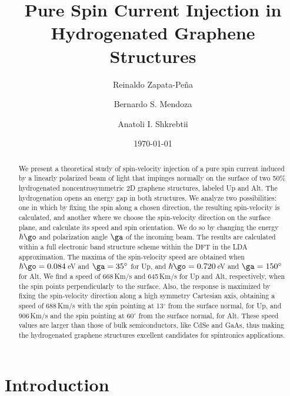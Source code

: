 \documentclass[floatfix,prb,aps,superscriptaddress,showpacs,11pt,preprint,letterpaper]{revtex4}
\begin{document}
\title{Pure Spin Current Injection in Hydrogenated Graphene Structures}
\author{Reinaldo Zapata-Pe\~na}
\author{Bernardo S. Mendoza}
\author{Anatoli I. Shkrebtii}

\date{\today}

\begin{abstract}
We present a theoretical study of spin-velocity injection of a pure spin current
induced by  a linearly polarized beam of light that impinges normally on the
surface of  two 50\% hydrogenated noncentrosymmetric 2D graphene structures,
labeled Up and Alt. The hydrogenation opens an energy gap in both structures. We
analyze two possibilities: one in which by fixing the spin along a chosen
direction, the resulting spin-velocity is calculated, and another where we
choose the spin-velocity direction on the surface plane, and calculate its speed
and spin orientation. We do so by changing the energy $\hbar\go$ and
polarization angle $\ga$  of the incoming  beam. The results are calculated
within a full electronic band structure scheme within the DFT in the LDA
approximation. The maxima of the spin-velocity speed are obtained when
$\hbar\go=0.084$\,eV and $\ga=35^\circ$ for Up, and $\hbar\go=0.720$\,eV and
$\ga=150^\circ$ for Alt. We find a speed of 668\,Km/s and 645\,Km/s for Up and
Alt, respectively, when the spin points perpendicularly to the surface. Also,
the response is maximized by fixing the spin-velocity direction along a high
symmetry Cartesian axis, obtaining a speed of 688\,Km/s with the spin  pointing
at 13$^\circ$ from the surface normal, for Up, and 906\,Km/s and the spin
pointing at 60$^\circ$ from the surface normal, for Alt. These speed values are
larger than those of bulk semiconductors, like CdSe and GaAs, thus making the
hydrogenated graphene structures excellent candidates for spintronics
applications.
\end{abstract}

\maketitle

\section{Introduction}
\label{sec:introduction}
\end{document}
